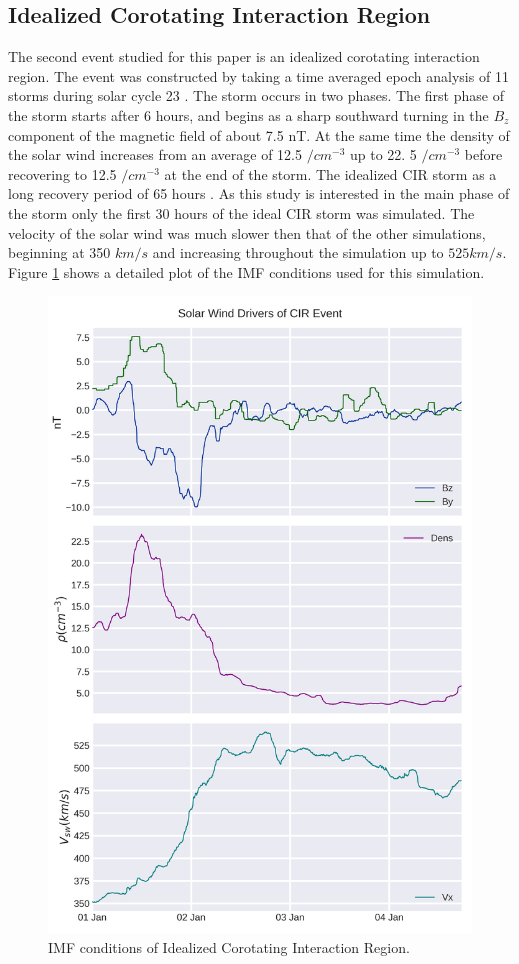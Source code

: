 \documentclass[utf8]{frontiersinFPHY_FAMS}
\begin{document}
\subsection{Idealized Corotating Interaction Region}

The second event studied for this paper is an idealized corotating interaction region. The event was constructed by taking a time averaged epoch analysis of 11 storms during solar cycle 23 \citet[Katus et al.(2015)]{Katus2015}. The storm occurs in two phases. The first phase of the storm starts after 6 hours, and begins as a sharp southward turning in the $B_{z}$ component of the magnetic field of about 7.5 nT. At the same time the density of the solar wind increases from an average of 12.5 $/cm^{-3}$ up to 22. 5 $/cm^{-3}$ before recovering to 12.5 $/cm^{-3}$ at the end of the storm. The idealized CIR storm as a long recovery period of 65 hours \citet[Katus et al.(2015)]{Katus2015}. As this study is interested in the main phase of the storm only the first 30 hours of the ideal CIR storm was simulated. The velocity of the solar wind was much slower then that of the other simulations, beginning at 350 $km/s$ and increasing throughout the simulation up to $525 km/s$. Figure \ref{fig:STORM1} shows a detailed plot of the IMF conditions used for this simulation. 

\begin{figure}[!ht]
\begin{center}
\includegraphics[width=.4\textwidth]{Ideal_CIR.png}
\caption{IMF conditions of Idealized Corotating Interaction Region.}
\label{fig:STORM1}
\end{center}
\end{figure}
\end{document}
